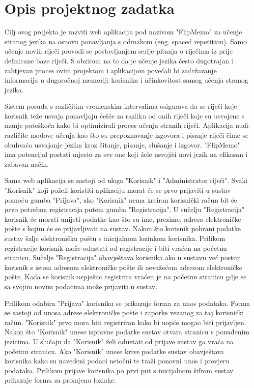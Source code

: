 \chapter{Opis projektnog zadatka}

Cilj ovog projekta je razviti web aplikaciju pod nazivom "FlipMemo" za učenje stranog jezika na osnovu ponavljanja s odmakom (eng. spaced repetition). Samo učenje novih riječi provodi se postavljanjem serije pitanja o riječima iz prije definirane baze riječi. S obzirom na to da je učenje jezika često dugotrajan i zahtjevan proces ovim projektom i aplikacijom povećali bi zadržavanje informacija u dugoročnoj memoriji korisnika i učinkovitost samog učenja stranog jezika.

Sistem posuda s različitim vremenskim intervalima osigurava da se riječi koje korisnik teže usvaja ponavljaju češće za razliku od onih riječi koje su usvojene s manje poteškoća kako bi optimizirali proces učenja stranih riječi. Aplikacija nudi različite modove učenja kao što su prepoznavanje izgovora i pisanje riječi čime se obuhvaća usvajanje jezika kroz čitanje, pisanje, slušanje i izgovor. "FlipMemo" ima potencijal postati mjesto za sve one koji žele usvojiti novi jezik na efikasan i zabavan način.

Sama web aplikacija se sastoji od uloga "Korisnik" i "Administrator riječi". Svaki "Korisnik" koji poželi koristiti aplikaciju morat će se prvo prijaviti u sustav pomoću  gumba "Prijava", ako "Korisnik" nema kreiran korisnički račun bit će prvo potrebna registracija putem gumba "Registracija". U sučelju "Registracija" korisnik će morati unijeti podatke kao što su ime, prezime, adresa elektroničke pošte s kojim će se prijavljivati na sustav. Nakon što korisnik pohrani podatke sustav šalje elektroničku poštu s inicijalnom lozinkom korisnika. Prilikom registracije korisnik može odustati od registracije i biti vraćen na početnu stranicu. Sučelje "Registracija" obavještava korisnika ako u sustavu već postoji korisnik s istom adresom elektroničke pošte ili nevažećom adresom elektroničke pošte. Kada se korisnik uspješno registrira vraćen je na početnu stranicu gdje se sa svojim novim podacima može prijaviti u sustav.

Prilikom odabira "Prijava" korisniku se prikazuje forma za unos podataka. Forma se sastoji od unosa adrese elektroničke pošte i zaporke vezanog za taj korisnički račun. "Korisnik" prvo mora biti registriran kako bi uopće mogao biti prijavljen. Nakon što "Korisnik" unese ispravne podatke  sustav otvara stranicu s ponuđenim jezicima. U slučaju da "Korisnik" želi odustati od prijave sustav ga vraća na početnu stranicu. Ako "Korisnik" unese krive podatke sustav obavještava korisnika kako su navedeni podaci netočni te traži ponovni unos i provjeru podataka. Prilikom prijave korisnika po prvi put s inicijalnom šifrom sustav prikazuje formu za promjenu lozinke.

